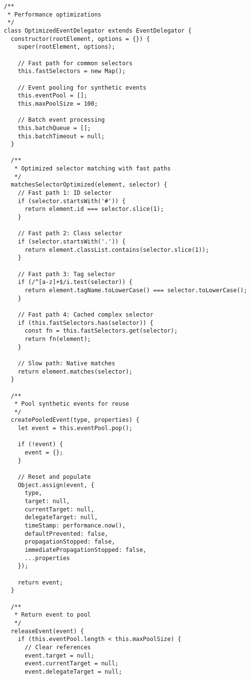 \documentclass[11pt]{article}
\begin{document}
\begin{verbatim}
/**
 * Performance optimizations
 */
class OptimizedEventDelegator extends EventDelegator {
  constructor(rootElement, options = {}) {
    super(rootElement, options);
    
    // Fast path for common selectors
    this.fastSelectors = new Map();
    
    // Event pooling for synthetic events
    this.eventPool = [];
    this.maxPoolSize = 100;
    
    // Batch event processing
    this.batchQueue = [];
    this.batchTimeout = null;
  }
  
  /**
   * Optimized selector matching with fast paths
   */
  matchesSelectorOptimized(element, selector) {
    // Fast path 1: ID selector
    if (selector.startsWith('#')) {
      return element.id === selector.slice(1);
    }
    
    // Fast path 2: Class selector
    if (selector.startsWith('.')) {
      return element.classList.contains(selector.slice(1));
    }
    
    // Fast path 3: Tag selector
    if (/^[a-z]+$/i.test(selector)) {
      return element.tagName.toLowerCase() === selector.toLowerCase();
    }
    
    // Fast path 4: Cached complex selector
    if (this.fastSelectors.has(selector)) {
      const fn = this.fastSelectors.get(selector);
      return fn(element);
    }
    
    // Slow path: Native matches
    return element.matches(selector);
  }
  
  /**
   * Pool synthetic events for reuse
   */
  createPooledEvent(type, properties) {
    let event = this.eventPool.pop();
    
    if (!event) {
      event = {};
    }
    
    // Reset and populate
    Object.assign(event, {
      type,
      target: null,
      currentTarget: null,
      delegateTarget: null,
      timeStamp: performance.now(),
      defaultPrevented: false,
      propagationStopped: false,
      immediatePropagationStopped: false,
      ...properties
    });
    
    return event;
  }
  
  /**
   * Return event to pool
   */
  releaseEvent(event) {
    if (this.eventPool.length < this.maxPoolSize) {
      // Clear references
      event.target = null;
      event.currentTarget = null;
      event.delegateTarget = null;
      

\end{verbatim}
\end{document}
